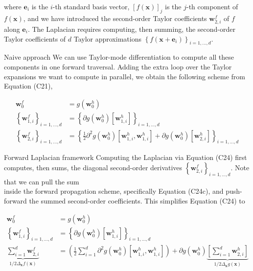 \documentclass[10pt]{article}
\begin{document}
where $\boldsymbol{e}_{i}$ is the $i$-th standard basis vector, $[f(\boldsymbol{x})]_{j}$ is the $j$-th component of $f(\boldsymbol{x})$, and we have introduced the second-order Taylor coefficients $\boldsymbol{w}_{2, i}^{f}$ of $f$ along $\boldsymbol{e}_{i}$. The Laplacian requires computing, then summing, the second-order Taylor coefficients of $d$ Taylor approximations $\left\{f\left(\boldsymbol{x}+\boldsymbol{e}_{i}\right)\right\}_{i=1, \ldots, d}$.

Naive approach We can use Taylor-mode differentiation to compute all these components in one forward traversal. Adding the extra loop over the Taylor expansions we want to compute in parallel, we obtain the following scheme from Equation (C21),


\begin{align*}
\boldsymbol{w}_{0}^{f} & =g\left(\boldsymbol{w}_{0}^{h}\right)  \tag{C24a}\\
\left\{\boldsymbol{w}_{1, i}^{f}\right\}_{i=1, \ldots, d} & =\left\{\partial g\left(\boldsymbol{w}_{0}^{h}\right)\left[\boldsymbol{w}_{1, i}^{h}\right]\right\}_{i=1, \ldots, d}  \tag{C24b}\\
\left\{\boldsymbol{w}_{2, i}^{f}\right\}_{i=1, \ldots, d} & =\left\{\frac{1}{2} \partial^{2} g\left(\boldsymbol{w}_{0}^{h}\right)\left[\boldsymbol{w}_{1, i}^{h}, \boldsymbol{w}_{1, i}^{h}\right]+\partial g\left(\boldsymbol{w}_{0}^{h}\right)\left[\boldsymbol{w}_{2, i}^{h}\right]\right\}_{i=1, \ldots, d} \tag{C24c}
\end{align*}


Forward Laplacian framework Computing the Laplacian via Equation (C24) first computes, then sums, the diagonal second-order derivatives $\left\{\boldsymbol{w}_{2, i}^{f}\right\}_{i=1, \ldots, d}$. Note that we can pull the sum\\
inside the forward propagation scheme, specifically Equation (C24c), and push-forward the summed second-order coefficients. This simplifies Equation (C24) to


\begin{align*}
\boldsymbol{w}_{0}^{f} & =g\left(\boldsymbol{w}_{0}^{h}\right)  \tag{C25a}\\
\left\{\boldsymbol{w}_{1, i}^{f}\right\}_{i=1, \ldots, d} & =\left\{\partial g\left(\boldsymbol{w}_{0}^{h}\right)\left[\boldsymbol{w}_{1, i}^{h}\right]\right\}_{i=1, \ldots, d}  \tag{C25b}\\
\underbrace{\sum_{i=1}^{d} \boldsymbol{w}_{2, i}^{f}}_{1 / 2 \Delta_{\boldsymbol{x}} f(\boldsymbol{x})} & =\left(\frac{1}{2} \sum_{i=1}^{d} \partial^{2} g\left(\boldsymbol{w}_{0}^{h}\right)\left[\boldsymbol{w}_{1, i}^{h}, \boldsymbol{w}_{1, i}^{h}\right]\right)+\partial g\left(\boldsymbol{w}_{0}^{h}\right) \underbrace{\left[\sum_{i=1}^{d} \boldsymbol{w}_{2, i}^{h}\right]}_{1 / 2 \Delta_{\boldsymbol{x}} g(\boldsymbol{x})} \tag{C25c}
\end{align*}
\end{document}
